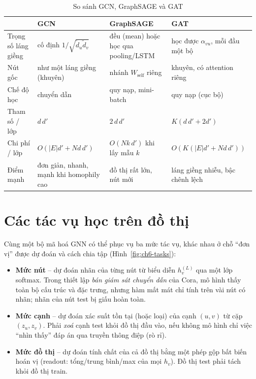 \begin{table}[H]\centering\caption{So sánh GCN, GraphSAGE và GAT}\label{tab:ch6-arch}
{\small\begin{tabular}{L{3.0cm}L{3.9cm}L{3.9cm}L{3.9cm}}
\toprule
 & GCN & GraphSAGE & GAT \\
\midrule
Trọng số láng giềng & cố định $1/\sqrt{\tilde d_u\tilde d_v}$ & đều (mean) hoặc học qua pooling/LSTM & học được $\alpha_{vu}$, mỗi đầu một bộ \\
Nút gốc & như một láng giềng (khuyên) & nhánh $W_{\text{self}}$ riêng & khuyên, có attention riêng \\
Chế độ học & chuyển dẫn & quy nạp, mini-batch & quy nạp (cục bộ) \\
Tham số / lớp & $d\,d'$ & $2\,d\,d'$ & $K(d\,d'+2d')$ \\
Chi phí / lớp & $O(|E|d'+Nd\,d')$ & $O(N k\,d')$ khi lấy mẫu $k$ & $O(K(|E|d'+Nd\,d'))$ \\
Điểm mạnh & đơn giản, nhanh, mạnh khi homophily cao & đồ thị rất lớn, nút mới & láng giềng nhiễu, bậc chênh lệch \\
\bottomrule
\end{tabular}}
\end{table}

\section{Các tác vụ học trên đồ thị}
\label{sec:gnn-tasks}

Cùng một bộ mã hoá GNN có thể phục vụ ba mức tác vụ, khác nhau ở chỗ ``đơn vị'' được dự đoán và cách chia tập
(Hình~\ref{fig:ch6-tasks}):
\begin{itemize}
  \item \textbf{Mức nút} -- dự đoán nhãn của từng nút từ biểu diễn $h_v^{(L)}$ qua một lớp softmax. Trong thiết lập
        \emph{bán giám sát chuyển dẫn} của Cora, mô hình thấy toàn bộ cấu trúc và đặc trưng, nhưng hàm mất mát chỉ tính
        trên vài nút có nhãn; nhãn của nút test bị giấu hoàn toàn.
  \item \textbf{Mức cạnh} -- dự đoán xác suất tồn tại (hoặc loại) của cạnh $(u,v)$ từ cặp $(z_u,z_v)$. Phải \emph{xoá}
        cạnh test khỏi đồ thị đầu vào, nếu không mô hình chỉ việc ``nhìn thấy'' đáp án qua truyền thông điệp (rò rỉ).
  \item \textbf{Mức đồ thị} -- dự đoán tính chất của cả đồ thị bằng một phép gộp bất biến hoán vị
        (readout: tổng/trung bình/max của mọi $h_v$). Đồ thị test phải tách khỏi đồ thị train.
\end{itemize}

